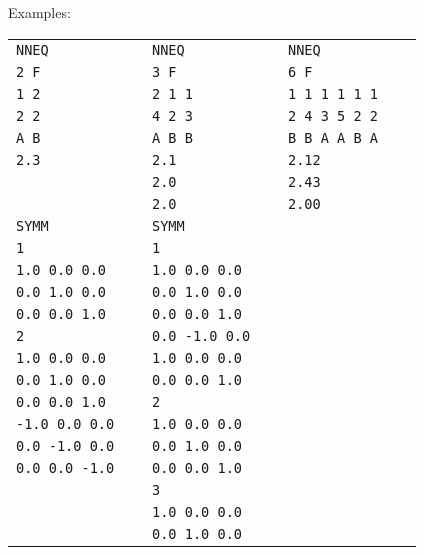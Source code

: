 \begin{keywordlist}
Examples:

\begin{tabular}{p{0.3\linewidth} p{0.3\linewidth} p{0.3\linewidth}}
{\color{Blue} \texttt {NNEQ}} & {\color{Blue} \texttt {NNEQ}}     & {\color{Blue} \texttt {NNEQ}}  \\
 \texttt {2  F}  &  \texttt {3  F}     &  \texttt {6  F} \\
 \texttt {1  2}  &  \texttt {2  1  1}  &  \texttt {1  1  1  1  1  1} \\
 \texttt {2  2}  &  \texttt {4  2  3}  &  \texttt {2  4  3  5  2  2} \\
 \texttt {A  B}  &  \texttt {A  B  B}  &  \texttt {B  B  A  A  B  A} \\
 \texttt {2.3 }  &  \texttt {2.1}      &  \texttt {2.12} \\
 \texttt {    }  &  \texttt {2.0}      &  \texttt {2.43} \\
 \texttt {    }  &  \texttt {2.0}      &  \texttt {2.00} \\
\hline
{\color{Blue}\texttt {SYMM}} & {\color{Blue} \texttt {SYMM}}  &  \\
 \texttt {1           }     &  \texttt {1            }        &   \\
 \texttt {1.0 0.0 0.0 }     &  \texttt {1.0 0.0 0.0  }        &   \\
 \texttt {0.0 1.0 0.0 }     &  \texttt {0.0 1.0 0.0  }        &   \\
 \texttt {0.0 0.0 1.0 }     &  \texttt {0.0 0.0 1.0  }        &   \\
 \texttt {2           }     &  \texttt {0.0 -1.0 0.0 }        &   \\
 \texttt {1.0 0.0 0.0 }     &  \texttt {1.0 0.0  0.0 }        &   \\
 \texttt {0.0 1.0 0.0 }     &  \texttt {0.0 0.0  1.0 }        &   \\
 \texttt {0.0 0.0 1.0 }     &  \texttt {2            }        &   \\
 \texttt {-1.0 0.0 0.0 }    &  \texttt {1.0 0.0 0.0  }        &   \\
 \texttt {0.0 -1.0 0.0 }    &  \texttt {0.0 1.0 0.0  }        &   \\
 \texttt {0.0 0.0 -1.0 }    &  \texttt {0.0 0.0 1.0  }        &   \\
 \texttt { }                &  \texttt {3            }        &   \\
 \texttt { }                &  \texttt {1.0 0.0 0.0  }        &   \\
 \texttt { }                &  \texttt {0.0 1.0 0.0  }        &   \\

\end{tabular}
\end{keywordlist}
